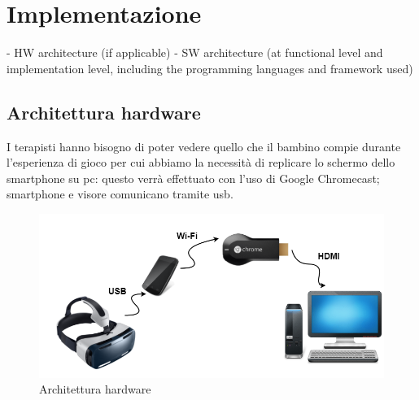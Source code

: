 \section{Implementazione} \label{sec:tecn}
- HW architecture (if applicable)
- SW architecture (at functional level and implementation level, including the programming languages and
framework used)

\subsection{Architettura hardware} \label{subsec:hard}
I terapisti hanno bisogno di poter vedere quello che il bambino compie durante l'esperienza di gioco per cui abbiamo la necessità di replicare lo schermo dello smartphone su pc: questo verrà effettuato con l'uso di Google Chromecast; smartphone e visore comunicano tramite \acs{usb}.
\vspace{70pt}
\begin{figure}[htbp]
\centering
\includegraphics[width=\textwidth]{Images/hardware}
\caption{Architettura hardware}
\label{fig:hardware}
\end{figure}
\clearpage


